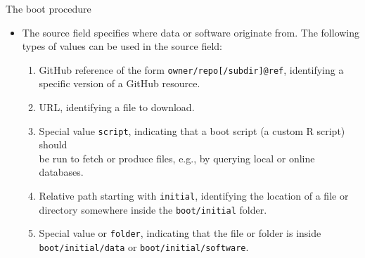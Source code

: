 \documentclass[aspectratio=169]{beamer}
\begin{document}
\begin{frame}{The boot procedure}\small
  \begin{itemize}
    \item[] The source field specifies where data or software originate from.
    The following\\[0.2ex]
    types of values can be used in the source field:\\[2ex]
    \begin{enumerate}
      \item {\green GitHub reference} of the form {\tt owner/repo[/subdir]@ref},
      identifying a\\
      specific version of a GitHub resource.\\[2ex]
      \item {\green URL}, identifying a file to download.\\[2ex]
      \item Special value {\tt\green script}, indicating that a boot script (a
      custom R script) should\\
      be run to fetch or produce files, e.g., by querying local or online
      databases.\\[2ex]
      \item {\green Relative path} starting with {\tt initial}, identifying the
      location of a file or\\
      directory somewhere inside the {\tt boot/initial} folder.\\[2ex]
      \item Special value { or {\tt folder}}, indicating that
      the file or folder is inside {\tt boot/initial/data} or
      {\tt boot/initial/software}.\\[5ex]
    \end{enumerate}
  \end{itemize}
\end{frame}

\end{document}
